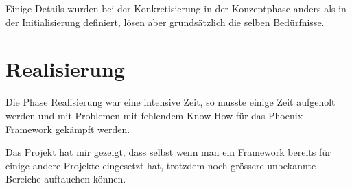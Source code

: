Einige Details wurden bei der Konkretisierung in der Konzeptphase anders als
in der Initialisierung definiert, lösen aber grundsätzlich die selben
Bedürfnisse.

\section{Realisierung}

Die Phase Realisierung war eine intensive Zeit, so musste einige Zeit aufgeholt
werden und mit Problemen mit fehlendem Know-How für das Phoenix Framework
gekämpft werden.

Das Projekt hat mir gezeigt, dass selbst wenn man ein Framework bereits für
einige andere Projekte eingesetzt hat, trotzdem noch grössere unbekannte
Bereiche auftauchen können.
